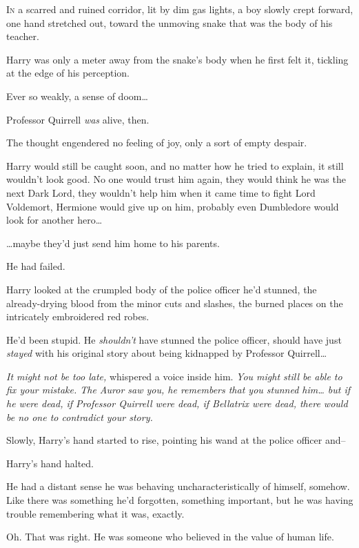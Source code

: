 
\lettrine{I}{n} a scarred and ruined corridor, lit by dim gas lights, a boy slowly crept forward, one hand stretched out, toward the unmoving snake that was the body of his teacher.

Harry was only a meter away from the snake's body when he first felt it, tickling at the edge of his perception.

Ever so weakly, a sense of doom{\ldots}

Professor Quirrell \emph{was} alive, then.

The thought engendered no feeling of joy, only a sort of empty despair.

Harry would still be caught soon, and no matter how he tried to explain, it still wouldn't look good. No one would trust him again, they would think he was the next Dark Lord, they wouldn't help him when it came time to fight Lord Voldemort, Hermione would give up on him, probably even Dumbledore would look for another hero{\ldots}

{\ldots}maybe they'd just send him home to his parents.

He had failed.

Harry looked at the crumpled body of the police officer he'd stunned, the already-drying blood from the minor cuts and slashes, the burned places on the intricately embroidered red robes.

He'd been stupid. He \emph{shouldn't} have stunned the police officer, should have just \emph{stayed} with his original story about being kidnapped by Professor Quirrell{\ldots}

\emph{It might not be too late,} whispered a voice inside him. \emph{You might still be able to fix your mistake. The Auror saw you, he remembers that you stunned him{\ldots} but if he were dead, if Professor Quirrell were dead, if Bellatrix were dead, there would be no one to contradict your story.}

Slowly, Harry's hand started to rise, pointing his wand at the police officer and\---

Harry's hand halted.

He had a distant sense he was behaving uncharacteristically of himself, somehow. Like there was something he'd forgotten, something important, but he was having trouble remembering what it was, exactly.

Oh. That was right. He was someone who believed in the value of human life.

